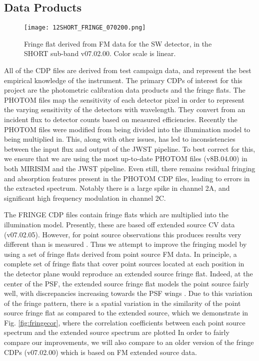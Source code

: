 \subsection{Data Products}
\begin{wrapfigure}{r}{5.5cm}
	\vspace{-1em}
	\centering
	\texttt{[image: 12SHORT\_FRINGE\_070200.png]}
	\caption{Fringe flat derived from FM data for the SW detector, in the SHORT sub-band v07.02.00. Color scale is linear.}
	\label{fig:fringeflat}
	\vspace{-2em}
\end{wrapfigure}
All of the CDP files are derived from test campaign data, and represent the best empirical knowledge of the instrument.
The primary CDPs of interest for this project are the photometric calibration data products and the fringe flats.
The PHOTOM files map the sensitivity of each detector pixel in order to represent the varying sensitivity of the detectors with wavelength. 
They convert from an incident flux to detector counts based on measured efficiencies.
Recently the PHOTOM files were modified from being divided into the illumination model to being multiplied in. 
This, along with other issues, has led to inconsistencies between the input flux and output of the JWST pipeline.
To best correct for this, we ensure that we are using the most up-to-date PHOTOM files (v8B.04.00) in both MIRISIM and the JWST pipeline.
Even still, there remains residual fringing and absorption features present in the PHOTOM CDP files, leading to errors in the extracted spectrum.
Notably there is a large spike in channel 2A, and significant high frequency modulation in channel 2C.

The FRINGE CDP files contain fringe flats which are multiplied into the illumination model. 
Presently, these are based off extended source CV data (v07.02.05).
However, for point source observations this produces results very different than is measured \parencite{Argyriou2018a}.
Thus we attempt to improve the fringing model by using a set of fringe flats derived from point source FM data. 
In principle, a complete set of fringe flats that cover point sources located at each position in the detector plane would reproduce an extended source fringe flat.
Indeed, at the center of the PSF, the extended source fringe flat models the point source fairly well, with discrepancies increasing towards the PSF wings \parencite{Argyriou2020}.
Due to this variation of the fringe pattern, there is a spatial variation in the similarity of the point source fringe flat as compared to the extended source, which we demonstrate in Fig. \ref{fig:fringecor}, where the correlation coefficients between each point source spectrum and the extended source spectrum are plotted
In order to fairly compare our improvements, we will also compare to an older version of the fringe CDPs (v07.02.00) which is based on FM extended source data.

